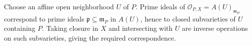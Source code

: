 Choose an affine open neighborhood $U$ of $P$. Prime ideals of $\mathcal O_{P,X}=A(U)_{\mathfrak m_P}$ correspond to prime ideals $\mathfrak p\subseteq\mathfrak m_P$ in $A(U)$, hence to closed subvarieties of $U$ containing $P$. Taking closure in $X$ and intersecting with $U$ are inverse operations on such subvarieties, giving the required correspondence.
